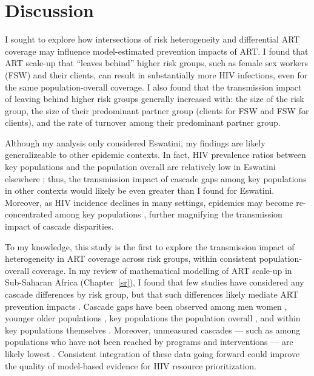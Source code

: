 \section{Discussion}\label{art.disc}
I sought to explore how intersections of risk heterogeneity and differential ART coverage
may influence model-estimated prevention impacts of ART.
I found that ART scale-up that ``leaves behind'' higher risk groups,
such as female sex workers (FSW) and their clients,
can result in substantially more HIV infections,
even for the same population-overall coverage.
I also found that the transmission impact of leaving behind higher risk groups
generally increased with:
the size of the risk group,
the size of their predominant partner group (\ie clients for FSW and FSW for clients),
and the rate of turnover among their predominant partner group.
\par
Although my analysis only considered Eswatini,
my findings are likely generalizeable to other epidemic contexts.
In fact, HIV prevalence ratios between key populations and the population overall
are relatively low in Eswatini \vs elsewhere \cite{Baral2012,Hessou2019};
thus, the transmission impact of cascade gaps among key populations in other contexts
would likely be even greater than I found for Eswatini.
Moreover, as HIV incidence declines in many settings,
epidemics may become re-concentrated among key populations \cite{Brown2019,Garnett2021},
further magnifying the transmission impact of cascade disparities.
\par
To my knowledge, this study is the first to explore the transmission impact of
heterogeneity in ART coverage across risk groups, within consistent population-overall coverage.
In my review of mathematical modelling of ART scale-up in Sub-Saharan Africa (Chapter~\ref{sr}),
I found that few studies have considered any cascade differences by risk group,
but that such differences likely mediate ART prevention impacts \cite{Knight2022sr}.
Cascade gaps have been observed among men \vs women \cite{Quinn2019,Green2020},
younger \vs older populations \cite{Green2020,Lebelonyane2021},
key populations \vs the population overall \cite{Hakim2018},
and within key populations themselves \cite{Mayanja2018,Jaffer2022}.
Moreover, unmeasured cascades
--- such as among populations who have not been reached by programs and interventions ---
are likely lowest \cite{Hakim2018,Boothe2021}.
Consistent integration of these data going forward could
improve the quality of model-based evidence for HIV resource prioritization.
